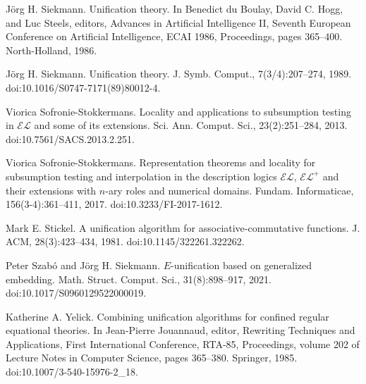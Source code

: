 \par\noindent  [52]  Jörg H. Siekmann.  Unification theory.  In Benedict du Boulay, David C. Hogg, and Luc Steels, editors, Advances in Artificial Intelligence II, Seventh European Conference on Artificial Intelligence, ECAI 1986, Proceedings, pages 365–400. North-Holland, 1986.  
 
\par\noindent  [53]  Jörg H. Siekmann.  Unification theory.  J. Symb. Comput., 7(3/4):207–274, 1989.  doi:10.1016/S0747-7171(89)80012-4.  
 
\par\noindent  [54]  Viorica Sofronie-Stokkermans.  Locality and applications to subsumption testing in $\mathcal{EL}$ and some of its extensions.  Sci. Ann. Comput. Sci., 23(2):251–284, 2013.  doi:10.7561/SACS.2013.2.251.  
 
\par\noindent  [55]  Viorica Sofronie-Stokkermans.  Representation theorems and locality for subsumption testing and interpolation in the description logics $\mathcal{EL}$, $\mathcal{EL}^{+}$ and their extensions with $n$-ary roles and numerical domains.  Fundam. Informaticae, 156(3-4):361–411, 2017.  doi:10.3233/FI-2017-1612.  
 
\par\noindent  [56]  Mark E. Stickel.  A unification algorithm for associative-commutative functions.  J. ACM, 28(3):423–434, 1981.  doi:10.1145/322261.322262.  
 
\par\noindent  [57]  Peter Szabó and Jörg H. Siekmann.  $E$-unification based on generalized embedding.  Math. Struct. Comput. Sci., 31(8):898–917, 2021.  doi:10.1017/S0960129522000019.  
 
\par\noindent  [58]  Katherine A. Yelick.  Combining unification algorithms for confined regular equational theories.  In Jean-Pierre Jouannaud, editor, Rewriting Techniques and Applications, First International Conference, RTA-85, Proceedings, volume 202 of Lecture Notes in Computer Science, pages 365–380. Springer, 1985.  doi:10.1007/3-540-15976-2\_18.  
  

